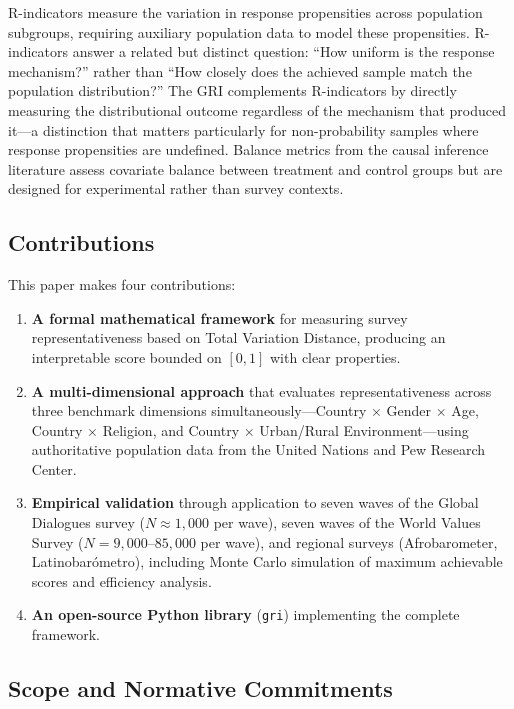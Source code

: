 \documentclass[11pt,a4paper]{article}
\begin{document}
R-indicators \citep{schouten2009indicators} measure the variation in response propensities across population subgroups, requiring auxiliary population data to model these propensities. R-indicators answer a related but distinct question: ``How uniform is the response mechanism?'' rather than ``How closely does the achieved sample match the population distribution?'' The GRI complements R-indicators by directly measuring the distributional outcome regardless of the mechanism that produced it---a distinction that matters particularly for non-probability samples where response propensities are undefined. Balance metrics from the causal inference literature \citep{rubin2001using,stuart2010matching} assess covariate balance between treatment and control groups but are designed for experimental rather than survey contexts.

\subsection{Contributions}

This paper makes four contributions:
\begin{enumerate}
    \item \textbf{A formal mathematical framework} for measuring survey representativeness based on Total Variation Distance, producing an interpretable score bounded on $[0, 1]$ with clear properties.
    \item \textbf{A multi-dimensional approach} that evaluates representativeness across three benchmark dimensions simultaneously---Country $\times$ Gender $\times$ Age, Country $\times$ Religion, and Country $\times$ Urban/Rural Environment---using authoritative population data from the United Nations and Pew Research Center.
    \item \textbf{Empirical validation} through application to seven waves of the Global Dialogues survey ($N \approx 1{,}000$ per wave), seven waves of the World Values Survey ($N = 9{,}000$--$85{,}000$ per wave), and regional surveys (Afrobarometer, Latinobar\'{o}metro), including Monte Carlo simulation of maximum achievable scores and efficiency analysis.
    \item \textbf{An open-source Python library} (\texttt{gri}) implementing the complete framework.
\end{enumerate}

\subsection{Scope and Normative Commitments}
\end{document}
